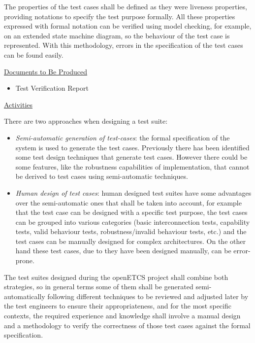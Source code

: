 The properties of the test cases shall be defined as they were
liveness properties, providing notations to specify the test purpose
formally. All these properties expressed with formal notation can be
verified using model checking, for example, on an extended state
machine diagram, so the behaviour of the test case is
represented. With this methodology, errors in the specification of the
test cases can be found easily.

\underline{Documents to Be Produced} 

\begin{itemize}
\item Test Verification Report
\end{itemize}

\underline{Activities}

There are two approaches when designing a test suite:
\begin{itemize}
\item \textit{Semi-automatic generation of test-cases}: the formal
  specification of the system is used to generate the test
  cases. Previously there has been identified some test design
  techniques that generate test cases. However there could be some
  features, like the robustness capabilities of implementation, that
  cannot be derived to test cases using semi-automatic techniques.
\item \textit{Human design of test cases}: human designed test suites
  have some advantages over the semi-automatic ones that shall be
  taken into account, for example that the test case can be designed
  with a specific test purpose, the test cases can be grouped into
  various categories (basic interconnection tests, capability tests,
  valid behaviour tests, robustness/invalid behaviour tests, etc.) and
  the test cases can be manually designed for complex
  architectures. On the other hand these test cases, due to they have
  been designed manually, can be error-prone.
\end{itemize}

The test suites designed during the openETCS project shall combine
both strategies, so in general terms some of them shall be generated
semi-automatically following different techniques to be reviewed and
adjusted later by the test engineers to ensure their appropriateness,
and for the most specific contexts, the required experience and
knowledge shall involve a manual design and a methodology to verify
the correctness of those test cases against the formal specification.

